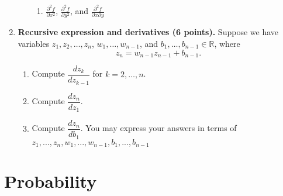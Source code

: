 \documentclass[11pt]{article}
\begin{document}
\begin{enumerate}[label=\arabic*., resume]
\begin{enumerate}[label=(\alph*)]
\begin{enumerate}[label=(\roman*)]
                        \item \(\frac{\partial^2 f}{\partial x^2}\), \(\frac{\partial^2 f}{\partial y^2}\), and \(\frac{\partial^2 f}{\partial x \partial y}\)

                        
                    \end{enumerate}
          \end{enumerate}

       
    \newpage
    
        

    \item \textbf{Recursive expression and derivatives (6 points).}
          Suppose we have variables \(z_1, z_2, \dots, z_n\), \(w_1, \dots, w_{n-1}\), and \(b_1, \dots, b_{n-1} \in \mathbb{R}\), where
          \[
              z_n = w_{n-1}z_{n-1} + b_{n-1}.
          \]
          \begin{enumerate}[label=(\alph*)]
              \item Compute \(\dfrac{dz_k}{dz_{k-1}}\) for \(k = 2, \dots, n\).

              
              \item Compute \(\dfrac{dz_n}{dz_1}\).


              \item Compute \(\dfrac{dz_n}{db_1}\).
           You may express your answers in terms of $z_1,...,z_n,w_1,...,w_{n-1},b_1,...,b_{n-1}$

           
          \end{enumerate}

          

\end{enumerate}
\newpage



\section*{Probability}
\end{document}
